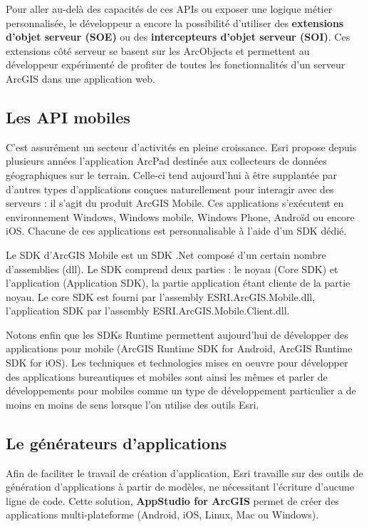 \documentclass[11pt]{article}
\begin{document}
Pour aller au-delà des capacités de ces APIs ou exposer une logique métier personnalisée, le développeur a encore la possibilité d'utiliser des \textbf{extensions d'objet serveur (SOE)} ou des \textbf{intercepteurs d'objet serveur (SOI)}. Ces extensions côté serveur se basent sur les ArcObjects et permettent au développeur expérimenté de profiter de toutes les fonctionnalités d'un serveur ArcGIS dans une application web.


\subsection{Les API mobiles}
C'est assurément un secteur d'activités en pleine croissance. Esri propose depuis plusieurs années l'application ArcPad destinée aux collecteurs de données géographiques sur le terrain. Celle-ci tend aujourd'hui à être supplantée par d'autres types d'applications conçues naturellement pour interagir avec des serveurs : il s'agit du produit ArcGIS Mobile. Ces applications s'exécutent en environnement Windows, Windows mobile, Windows Phone, Androïd ou encore iOS. Chacune de ces applications est personnalisable à l'aide d'un SDK dédié.

Le SDK d'ArcGIS Mobile est un SDK .Net composé d'un certain nombre d'assemblies (dll). Le SDK comprend deux parties : le noyau (Core SDK) et l'application (Application SDK), la partie application étant cliente de la partie noyau. Le core SDK est fourni par l'assembly ESRI.ArcGIS.Mobile.dll, l'application SDK par l'assembly ESRI.ArcGIS.Mobile.Client.dll.

Notons enfin que les SDKs Runtime permettent aujourd'hui de développer des applications pour mobile (ArcGIS Runtime SDK for Android, ArcGIS Runtime SDK for iOS). Les techniques et technologies mises en oeuvre pour développer des applications bureautiques et mobiles sont ainsi les mêmes et parler de développements pour mobiles comme un type de développement particulier a de moins en moins de sens lorsque l'on utilise des outils Esri.

 
\subsection{Le générateurs d'applications}
Afin de faciliter le travail de création d'application, Esri travaille sur des outils de génération d'applications à partir de modèles, ne nécessitant l'écriture d'aucune ligne de code. Cette solution, \textbf{AppStudio for ArcGIS} permet de créer des applications multi-plateforme (Android, iOS, Linux, Mac ou Windows).
\end{document}

